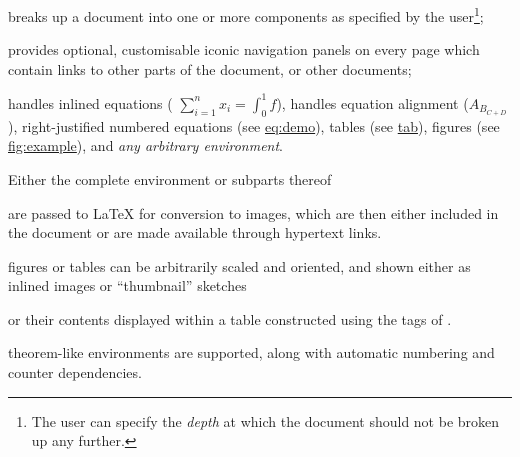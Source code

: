 \begin{itemize}
\item 
breaks up a document into one or more components as specified
by the user\footnote{The user can specify the \emph{depth} at which 
the document should not be broken up any further.};

%
\item 
provides optional, customisable iconic navigation
panels on every page which contain links to other parts of the
document, or other documents;

%
%
%
\item 
handles inlined equations ( \(\sum_{i=1}^{n} x_{i} = \int_{0}^{1} f \)), 
handles equation alignment ($A_{B_{C+D}}$), 
right-justified numbered equations (see \hyperref{example}{equation~}{}{eq:demo}), 
tables (see \hyperref{example}{Table~}{}{tab}), 
figures (see \hyperref{example}{Figure~}{}{fig:example}),
and \emph{any arbitrary environment}.
\begin{changebar}%
Either the complete environment or subparts thereof\html{\dots}
\end{changebar}%
are passed to \LaTeX{}  for conversion to images, which are then either included
in the document or are made available through hypertext links.

%
%
%
\begin{changebar}%
\item 
figures or tables can be arbitrarily scaled and oriented, 
and shown either as inlined images or ``thumbnail'' sketches\html{\dots}
\begin{changebar}
or their contents displayed within a table constructed
using the  tags of \HTMLiii.
\end{changebar}\end{changebar}

%
%
%
%
\begin{changebar}
\item
theorem-like environments are supported, along with
automatic numbering and counter dependencies.
\end{changebar}%


\end{itemize}
